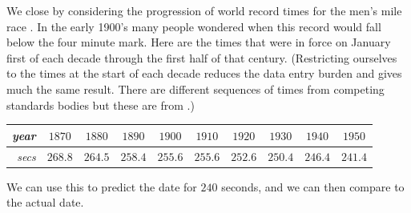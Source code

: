 We close by considering 
the progression of world record times for the men's mile race \cite{Oakley}.
In the early 1900's many people wondered when
this record would fall below the four minute mark.
Here are the times that were in force on January first
of each decade through the first half of that century.
(Restricting ourselves to the times at the start of 
each decade reduces the data entry burden 
and gives much the same result.
There are different sequences of times from competing standards
bodies but these are from \cite{WikipediaMensMile}.)
\begin{center} \small
  \begin{tabular}{r|ccccccccc}
    \textit{year} &$1870$ &$1880$ &$1890$  &$1900$  
        &$1910$  &$1920$  &$1930$ &$1940$ &$1950$   \\
    \hline
    \textit{secs}  &$268.8$  &$264.5$  &$258.4$  &$255.6$  
        &$255.6$  &$252.6$  &$250.4$ &$246.4$ &$241.4$
  \end{tabular}  
\end{center}
We can use this to predict the date for $240$ seconds, and 
we can then compare to the actual date.


